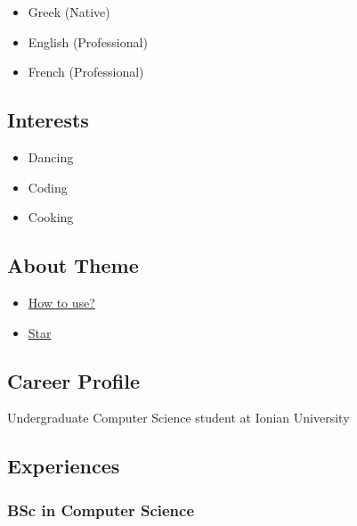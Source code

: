 \documentclass[english,]{article}
\providecommand{\tightlist}{%
  \setlength{\itemsep}{0pt}\setlength{\parskip}{0pt}}
\begin{document}
\begin{itemize}
\tightlist
\item
  Greek {(Native)}
\item
  English {(Professional)}
\item
  French {(Professional)}
\end{itemize}

\hypertarget{interests}{%
\subsection{Interests}\label{interests}}

\begin{itemize}
\tightlist
\item
  Dancing
\item
  Coding
\item
  Cooking
\end{itemize}

\hypertarget{about-theme}{%
\subsection{About Theme}\label{about-theme}}

\begin{itemize}
\tightlist
\item
  \href{https://www.youtube.com/watch?v=Jnmj1dXDbNk}{How to use?}
\item
  \href{https://github.com/sharu725/online-cv}{Star}
\end{itemize}

\hypertarget{career-profile}{%
\subsection{\texorpdfstring{{ \emph{} \emph{} } Career
Profile}{    Career Profile}}\label{career-profile}}

Undergraduate Computer Science student at Ionian University

\hypertarget{experiences}{%
\subsection{\texorpdfstring{{ \emph{} \emph{} }
Experiences}{    Experiences}}\label{experiences}}

\hypertarget{bsc-in-computer-science-1}{%
\subsubsection{BSc in Computer
Science}\label{bsc-in-computer-science-1}}
\end{document}
